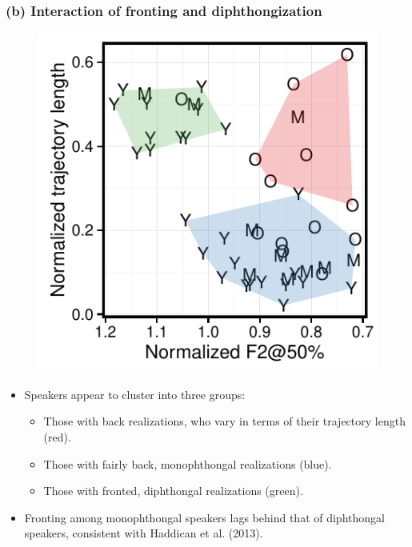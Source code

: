 \documentclass[a0,portrait]{a0poster}
\begin{document}
\begin{multicols*}{3}
\subsubsection*{(b) Interaction of fronting and diphthongization}
\vspace*{-1cm}
\begin{minipage}{0.3\textwidth}
\begin{figure}[H]
\includegraphics[scale=2]{o_fronting_dip.pdf}
\end{figure}
\end{minipage}
\hspace*{-9cm}
\begin{minipage}{0.15\textwidth}
\raggedright
\begin{itemize}
\item{Speakers appear to cluster into three groups:\begin{itemize}
\item{Those with back  realizations, who vary in terms of their trajectory length (red).}
\item{Those with fairly back, monophthongal realizations (blue).}
\item{Those with fronted, diphthongal realizations (green).}\end{itemize}}
\end{itemize}
\end{minipage}
\begin{itemize}
\item{Fronting among monophthongal speakers lags behind that of diphthongal speakers, consistent with Haddican et al. (2013).}
\end{itemize}


\end{multicols*}
\end{document}
